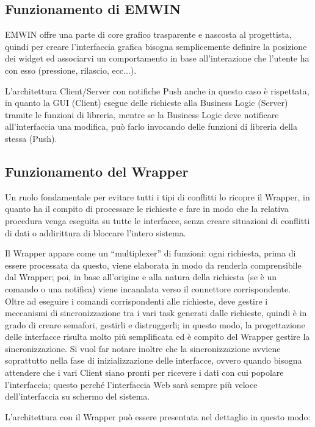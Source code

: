 \documentclass[journal]{IEEEtran}
\begin{document}
\subsection{Funzionamento di EMWIN}

EMWIN offre una parte di core grafico trasparente e nascosta al progettista, quindi per creare l'interfaccia grafica bisogna semplicemente definire la posizione dei widget ed associarvi un comportamento in base all'interazione che l'utente ha con esso (pressione, rilascio, ecc...).

L'architettura Client/Server con notifiche Push anche in questo caso è rispettata, in quanto la GUI (Client) esegue delle richieste alla Business Logic (Server) tramite le funzioni di libreria, mentre se la Business Logic deve notificare all'interfaccia una modifica, può farlo invocando delle funzioni di libreria della stessa (Push).

\subsection{Funzionamento del Wrapper}

Un ruolo fondamentale per evitare tutti i tipi di conflitti lo ricopre il Wrapper, in quanto ha il compito di processare le richieste e fare in modo che la relativa procedura venga eseguita su tutte le interfacce, senza creare situazioni di conflitti di dati o addirittura di bloccare l'intero sistema.

Il Wrapper appare come un ``multiplexer'' di funzioni: ogni richiesta, prima di essere processata da questo, viene elaborata in modo da renderla comprensibile dal Wrapper; poi, in base all'origine e alla natura della richiesta (se è un comando o una notifica) viene incanalata verso il connettore corrispondente. Oltre ad eseguire i comandi corrispondenti alle richieste, deve gestire i meccanismi di sincronizzazione tra i vari task generati dalle richieste, quindi è in grado di creare semafori, gestirli e distruggerli; in questo modo, la progettazione delle interfacce risulta molto più semplificata ed è compito del Wrapper gestire la sincronizzazione. Si vuol far notare inoltre che la sincronizzazione avviene soprattutto nella fase di inizializzazione delle interfacce, ovvero quando bisogna attendere che i vari Client siano pronti per ricevere i dati con cui popolare l'interfaccia; questo perché l'interfaccia Web sarà sempre più veloce dell'interfaccia su schermo del sistema.

L'architettura con il Wrapper può essere presentata nel dettaglio in questo modo: 
\end{document}
